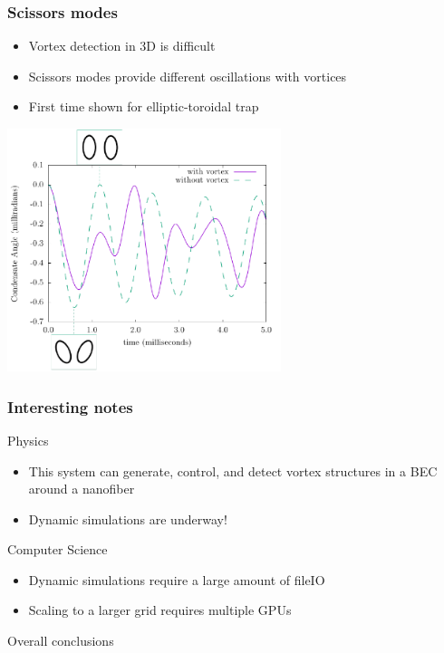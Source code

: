 \documentclass{beamer}
\begin{document}
\begin{frame}
\frametitle{Scissors modes}
\begin{itemize}
\item Vortex detection in 3D is difficult
\item Scissors modes provide different oscillations with vortices
\item First time shown for elliptic-toroidal trap
\end{itemize}
\begin{center}
\includegraphics[width=0.6\textwidth]{../data/3d/scissors_plot.pdf}
\end{center}
\end{frame}

\begin{frame}
\frametitle{Interesting notes}
Physics
\begin{itemize}
\item This system can generate, control, and detect vortex structures in a BEC around a nanofiber
\item Dynamic simulations are underway!
\end{itemize}
Computer Science
\begin{itemize}
\item Dynamic simulations require a large amount of fileIO
\item Scaling to a larger grid requires multiple GPUs
\end{itemize}
\end{frame}


\begin{frame}
\center \huge Overall conclusions
\end{frame}
\end{document}
